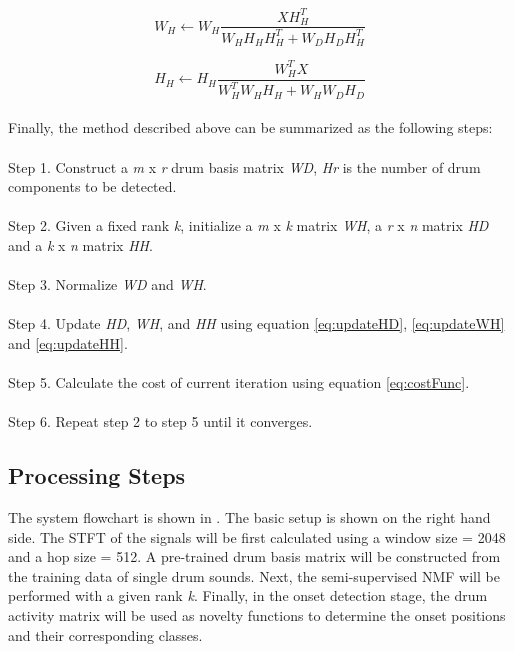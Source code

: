 \documentclass{article}
\begin{document}
\begin{equation}
W_{H} \leftarrow W_{H}\frac{X H_{H}^T}{W_{H} H_{H} H_{H}^T + W_{D} H_{D} H_{H}^T}
\label{eq:updateWH}
\end{equation}

\begin{equation}
H_{H} \leftarrow H_{H}\frac{W_{H}^T X}{W_{H}^T W_{H} H_{H} + W_{H} W_{D} H_{D}}
\label{eq:updateHH}
\end{equation}\\


Finally, the method described above can be summarized as the following steps:\\\\
Step 1. Construct a {\itshape m} x {\itshape r} drum basis matrix {\itshape W\tiny D}, {\itshape H\tiny r} is the number of drum components to be detected.\\\\
Step 2. Given a fixed rank {\itshape k}, initialize a {\itshape m} x {\itshape k} matrix {\itshape W\tiny H}, a {\itshape r} x {\itshape n} matrix {\itshape H\tiny D} and a {\itshape k} x {\itshape n} matrix {\itshape H\tiny H}.\\\\
Step 3. Normalize {\itshape W\tiny D} and {\itshape W\tiny H}.\\\\
Step 4. Update {\itshape H\tiny D}, {\itshape W\tiny H}, and {\itshape H\tiny H} using equation \eqref{eq:updateHD}, \eqref{eq:updateWH} and \eqref{eq:updateHH}.\\\\
Step 5. Calculate the cost of current iteration using equation \eqref{eq:costFunc}.\\\\
Step 6. Repeat step 2 to step 5 until it converges.\\ 
%
\subsection{Processing Steps}\label{subsec:processing steps}

The system flowchart is shown in . The basic setup is shown on the right hand side. The STFT of the signals will be first calculated using a window size = 2048 and a hop size = 512. A pre-trained drum basis matrix will be constructed from the training data of single drum sounds. Next, the semi-supervised NMF will be performed with a given rank {\itshape k}. Finally, in the onset detection stage, the drum activity matrix will be used as novelty functions to determine the onset positions and their corresponding classes.  
\end{document}
